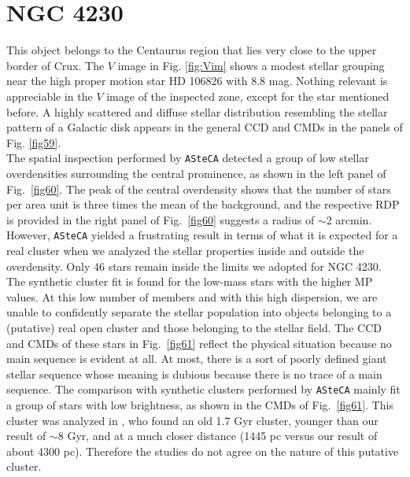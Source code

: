 \documentclass[draft]{aa}
\begin{document}
\section{NGC 4230}

This object belongs to the Centaurus region that lies very close to the upper
border of Crux. The $V$ image in Fig. \ref{fig:Vim} shows a modest stellar grouping near the high proper motion star HD 106826 with 8.8
mag.
Nothing relevant is appreciable in the $V$ image of the inspected zone, except for
the star mentioned before. A highly scattered and diffuse stellar distribution
resembling the stellar pattern of a Galactic disk appears in the general CCD
and CMDs in the panels of Fig. \ref{fig59}.\\

The spatial inspection performed by \texttt{ASteCA} detected a group of low
stellar overdensities surrounding the central prominence, as shown in the left
panel of Fig.~\ref{fig60}. The peak of the central overdensity shows that the
number of stars per area unit is three times the mean of the background, and the
respective RDP is provided in the right panel of Fig.~\ref{fig60} suggests a
radius of $\sim$2 arcmin.
However, \texttt{ASteCA} yielded a frustrating result in terms of what
it is expected for a real cluster when we analyzed the stellar properties inside
and outside the overdensity.
Only 46 stars remain inside the limits we adopted for NGC 4230. The synthetic
cluster fit is found for the low-mass stars with the higher MP values. At this
low number of members and with this high dispersion, we are unable to
confidently separate the stellar population into objects belonging to a 
(putative) real open cluster and those belonging to the stellar field.
%
The CCD and CMDs of these stars in Fig.~\ref{fig61} reflect the physical
situation because no main sequence is evident at all. At most, there is a sort of
poorly defined giant stellar sequence whose meaning is dubious because there is no
trace of a main sequence.
The comparison with synthetic clusters performed by \texttt{ASteCA}
mainly fit a group of stars with low brightness, as shown in the CMDs of
Fig.~\ref{fig61}. This cluster was analyzed in \cite{Tadross_2011}, who found an old 1.7 Gyr cluster, younger than our result of $\sim$8 Gyr,
and at a much closer distance (1445 pc versus our result of about 4300 pc).
Therefore the studies do not agree on the nature of this putative cluster.\\
\end{document}

